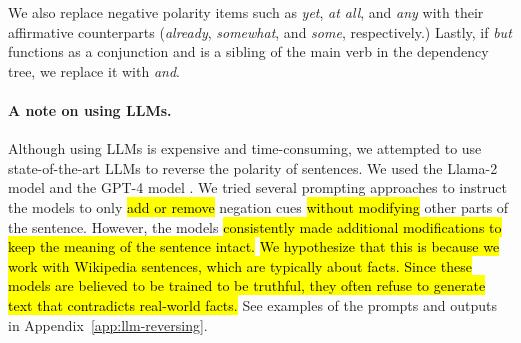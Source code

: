 We also replace negative polarity items such as \emph{yet}, \emph{at all}, and \emph{any}
with their affirmative counterparts (\emph{already}, \emph{somewhat}, and \emph{some}, respectively.)
Lastly, 
if \emph{but} functions as a conjunction and is a sibling of the main verb in the dependency tree, we replace it with \emph{and}.

\paragraph{A note on using LLMs.}
Although using LLMs is expensive and time-consuming, 
we attempted to use state-of-the-art LLMs to reverse the polarity of sentences.
We used the Llama-2 model \cite{touvron2023llama} and the GPT-4 model \cite{openai2024gpt4}. 
We tried several prompting approaches 
to instruct the models to only \hl{add or remove} negation cues \hl{without modifying} other parts of the sentence.
However, the models \hl{consistently made additional modifications to keep the meaning of the sentence intact. } 
\hl{
    We hypothesize that this is because we work with Wikipedia sentences, which are typically about facts.
    Since these models are believed to be trained to be truthful, 
    they often refuse to generate text that contradicts real-world facts.
}
See examples of the prompts and outputs in Appendix~\ref{app:llm-reversing}.
